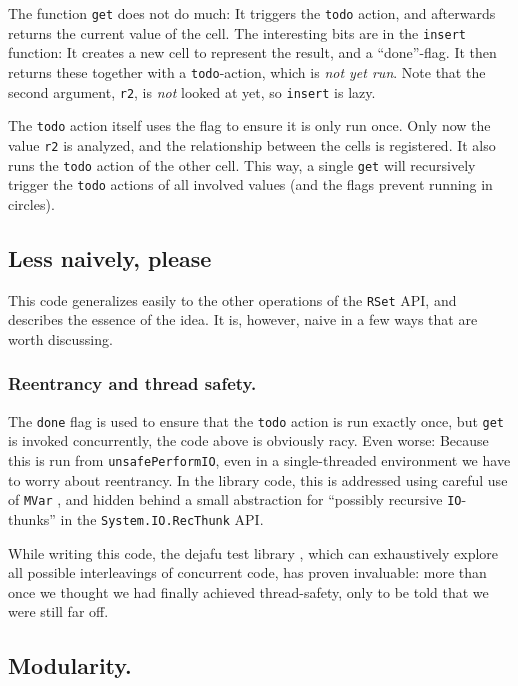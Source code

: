 \documentclass[manuscript,screen,acmsmall]{acmart}
\begin{document}
The function \verb|get| does not do much: It triggers the \verb|todo| action, and afterwards returns the current value of the cell. The interesting bits are in the \verb|insert| function: It creates a new cell to represent the result, and a “done”-flag. It then returns these together with a \verb|todo|-action, which is \emph{not yet run}. Note that the second argument, \verb|r2|, is \emph{not} looked at yet, so \verb|insert| is lazy.

The \verb|todo| action itself uses the flag to ensure it is only run once. Only now the value \verb|r2| is analyzed, and the relationship between the cells is registered. It also runs the \verb|todo| action of the other cell. This way, a single \verb|get| will recursively trigger the \verb|todo| actions of all involved values (and the flags prevent running in circles).

\subsection{Less naively, please}

This code generalizes easily to the other operations of the \verb|RSet| API, and describes the essence of the idea. It is, however, naive in a few ways that are worth discussing.

\subsubsection{Reentrancy and thread safety.}\label{sec:thread}

The \verb|done| flag is used to ensure that the \verb|todo| action is run exactly once, but \verb|get| is invoked concurrently, the code above is obviously racy. Even worse: Because this is run from \verb|unsafePerformIO|, even in a single-threaded environment we have to worry about reentrancy. In the library code, this is addressed using careful use of \verb|MVar| \cite{concurrent}, and hidden behind a small abstraction for “possibly recursive \verb|IO|-thunks” in the \verb|System.IO.RecThunk| API.

While writing this code, the dejafu test library \citep{dejafu}, which can exhaustively explore all possible interleavings of concurrent code, has proven invaluable: more than once we thought we had finally achieved thread-safety, only to be told that we were still far off.

\subsection{Modularity.}
\end{document}
